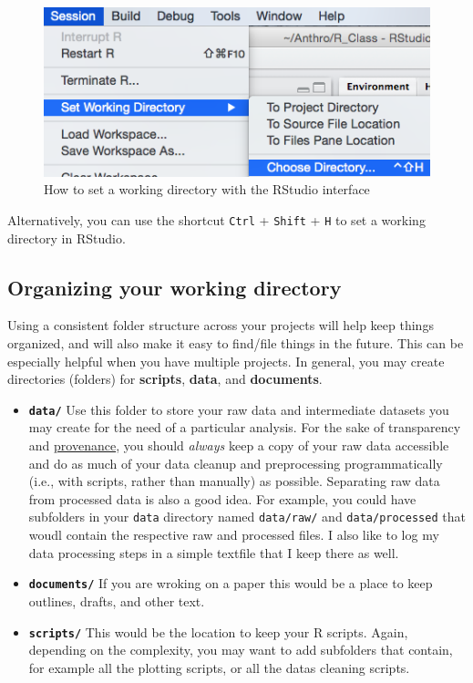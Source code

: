 \documentclass[
]{book}
\providecommand{\tightlist}{%
  \setlength{\itemsep}{0pt}\setlength{\parskip}{0pt}}
\begin{document}
\begin{figure}
\includegraphics[width=0.6\linewidth]{img/setWD} \caption{How to set a working directory with the RStudio interface}\label{fig:set-working-dir}
\end{figure}

Alternatively, you can use the shortcut \texttt{Ctrl} + \texttt{Shift} + \texttt{H} to set a working directory in RStudio.

\hypertarget{organizing-your-working-directory}{%
\subsection{Organizing your working directory}\label{organizing-your-working-directory}}

Using a consistent folder structure across your projects will help keep things
organized, and will also make it easy to find/file things in the future. This
can be especially helpful when you have multiple projects. In general, you may
create directories (folders) for \textbf{scripts}, \textbf{data}, and \textbf{documents}.

\begin{itemize}
\tightlist
\item
  \textbf{\texttt{data/}} Use this folder to store your raw data and intermediate
  datasets you may create for the need of a particular analysis. For the sake
  of transparency and \href{https://en.wikipedia.org/wiki/Provenance}{provenance},
  you should \emph{always} keep a copy of your raw data accessible and do as much
  of your data cleanup and preprocessing programmatically (i.e., with scripts,
  rather than manually) as possible. Separating raw data from processed data
  is also a good idea. For example, you could have subfolders in your \texttt{data} directory named
  \texttt{data/raw/}
  and \texttt{data/processed} that woudl contain the respective raw and processed files. I also like to log my data processing steps in a simple textfile that I keep there as well.
\item
  \textbf{\texttt{documents/}} If you are wroking on a paper this would be a place to keep outlines, drafts, and other
  text.
\item
  \textbf{\texttt{scripts/}} This would be the location to keep your R scripts. Again, depending on the complexity, you may want to add subfolders that contain, for example all the plotting scripts, or all the datas cleaning scripts.
\end{itemize}
\end{document}
